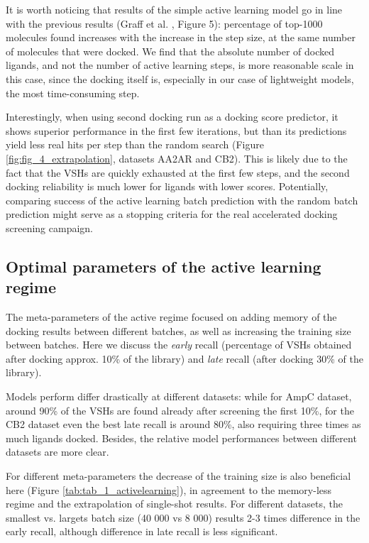 It is worth noticing that results of the simple active learning model go in line with the previous results (Graff et al. \cite{Graff2021AcceleratingLearning}, Figure 5): percentage of top-1000 molecules found increases with the increase in the step size, at the same number of molecules that were docked. We find that the absolute number of docked ligands, and not the number of active learning steps, is more reasonable scale in this case, since the docking itself is, especially in our case of lightweight models, the most time-consuming step.

Interestingly, when using second docking run as a docking score predictor, it shows superior performance in the first few iterations, but than its predictions yield less real hits per step than the random search (Figure \ref{fig:fig_4_extrapolation}, datasets AA2AR and CB2). This is likely due to the fact that the VSHs are quickly exhausted at the first few steps, and the second docking reliability is much lower for ligands with lower scores. Potentially, comparing success of the active learning batch prediction with the random batch prediction might serve as a stopping criteria for the real accelerated docking screening campaign.

\subsection{Optimal parameters of the active learning regime}
The meta-parameters of the active regime focused on adding memory of the docking results between different batches, as well as increasing the training size between batches. Here we discuss the \textit{early} recall (percentage of VSHs obtained after docking approx. 10\% of the library) and \textit{late} recall (after docking 30\% of the library).

Models perform differ drastically at different datasets: while for AmpC dataset, around 90\% of the VSHs are found already after screening the first 10\%, for the CB2 dataset even the best late recall is around 80\%, also requiring three times as much ligands docked. Besides, the relative model performances between different datasets are more clear.

For different meta-parameters the decrease of the training size is also beneficial here (Figure \ref{tab:tab_1_activelearning}), in agreement to the memory-less regime and the extrapolation of single-shot results. For different datasets, the smallest vs. largets batch size (40 000 vs 8 000) results 2-3 times difference in the early recall, although difference in late recall is less significant.

